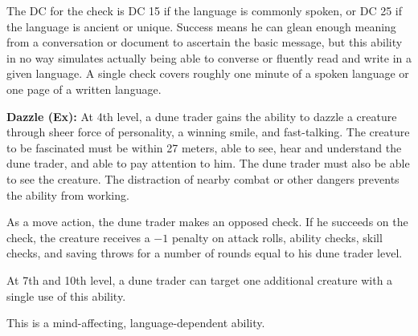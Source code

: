 {The DC for the check is DC 15 if the language is commonly spoken, or DC 25 if the language is ancient or unique. Success means he can glean enough meaning from a conversation or document to ascertain the basic message, but this ability in no way simulates actually being able to converse or fluently read and write in a given language. A single check covers roughly one minute of a spoken language or one page of a written language.

\textbf{Dazzle (Ex):} At 4th level, a dune trader gains the ability to dazzle a creature through sheer force of personality, a winning smile, and fast-talking. The creature to be fascinated must be within 27 meters, able to see, hear and understand the dune trader, and able to pay attention to him. The dune trader must also be able to see the creature. The distraction of nearby combat or other dangers prevents the ability from working.

As a move action, the dune trader makes an opposed  check. If he succeeds on the check, the creature receives a $-1$ penalty on attack rolls, ability checks, skill checks, and saving throws for a number of rounds equal to his dune trader level.

At 7th and 10th level, a dune trader can target one additional creature with a single use of this ability.

This is a mind-affecting, language-dependent ability.



}
